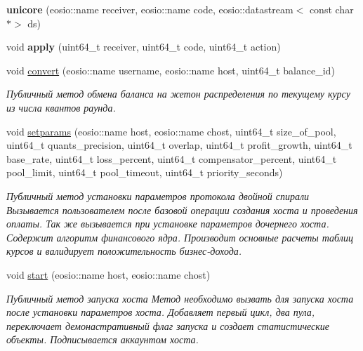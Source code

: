 \begin{DoxyCompactItemize}
\item 
\mbox{\label{classunicore_a8f1c99385890a2fe4645c4af8e7fcfc7}} 
{\bfseries unicore} (eosio\+::name receiver, eosio\+::name code, eosio\+::datastream$<$ const char $\ast$$>$ ds)
\item 
\mbox{\label{classunicore_added73f623a6df0537a4daef1c46ed8b}} 
void {\bfseries apply} (uint64\+\_\+t receiver, uint64\+\_\+t code, uint64\+\_\+t action)
\item 
\mbox{\label{classunicore_a30206473eb9672b7b67d0a85d2035ff3}} 
void \mbox{\hyperlink{classunicore_a30206473eb9672b7b67d0a85d2035ff3}{convert}} (eosio\+::name username, eosio\+::name host, uint64\+\_\+t balance\+\_\+id)
\begin{DoxyCompactList}\small\item\em Публичный метод обмена баланса на жетон распределения по текущему курсу из числа квантов раунда. \end{DoxyCompactList}\item 
void \mbox{\hyperlink{classunicore_a8898e75bc9abe84fd78c15f9de3731f5}{setparams}} (eosio\+::name host, eosio\+::name chost, uint64\+\_\+t size\+\_\+of\+\_\+pool, uint64\+\_\+t quants\+\_\+precision, uint64\+\_\+t overlap, uint64\+\_\+t profit\+\_\+growth, uint64\+\_\+t base\+\_\+rate, uint64\+\_\+t loss\+\_\+percent, uint64\+\_\+t compensator\+\_\+percent, uint64\+\_\+t pool\+\_\+limit, uint64\+\_\+t pool\+\_\+timeout, uint64\+\_\+t priority\+\_\+seconds)
\begin{DoxyCompactList}\small\item\em Публичный метод установки параметров протокола двойной спирали Вызывается пользователем после базовой операции создания хоста и проведения оплаты. Так же вызывается при установке параметров дочернего хоста. Содержит алгоритм финансового ядра. Производит основные расчеты таблиц курсов и валидирует положительность бизнес-\/дохода. \end{DoxyCompactList}\item 
void \mbox{\hyperlink{classunicore_ad83b75f3c4afd1ab954d428be8f6f7d7}{start}} (eosio\+::name host, eosio\+::name chost)
\begin{DoxyCompactList}\small\item\em Публичный метод запуска хоста Метод необходимо вызвать для запуска хоста после установки параметров хоста. Добавляет первый цикл, два пула, переключает демонастративный флаг запуска и создает статистические объекты. Подписывается аккаунтом хоста. \end{DoxyCompactList}\item 
$$
\end{DoxyCompactItemize}
